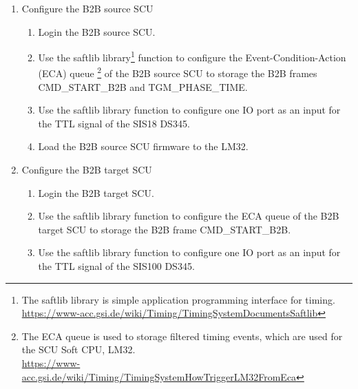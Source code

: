 \begin{enumerate}
  \item Configure the B2B source SCU
  \begin{enumerate}
    \item Login the B2B source SCU.
    \item Use the saftlib library\footnote{The saftlib library is simple application programming interface for timing.\\  \url{https://www-acc.gsi.de/wiki/Timing/TimingSystemDocumentsSaftlib}}  function to configure the Event-Condition-Action (ECA) queue \footnote{The ECA queue is used to storage filtered timing events, which are used for the SCU Soft CPU, LM32. \\ \url{https://www-acc.gsi.de/wiki/Timing/TimingSystemHowTriggerLM32FromEca}} of the B2B source SCU to storage the B2B frames CMD\_START\_B2B and TGM\_PHASE\_TIME.
	\item Use the saftlib library function to configure one IO port as an input for the TTL signal of the SIS18 DS345.
	\item Load the B2B source SCU firmware to the LM32.
	 \end{enumerate}
  \item Configure the B2B target SCU
    \begin{enumerate}
    \item Login the B2B target SCU.
    \item Use the saftlib library function to configure the ECA queue of the B2B target SCU to storage the B2B frame CMD\_START\_B2B.
	\item Use the saftlib library function to configure one IO port as an input for the TTL signal of the SIS100 DS345.

\end{enumerate}
\end{enumerate}
